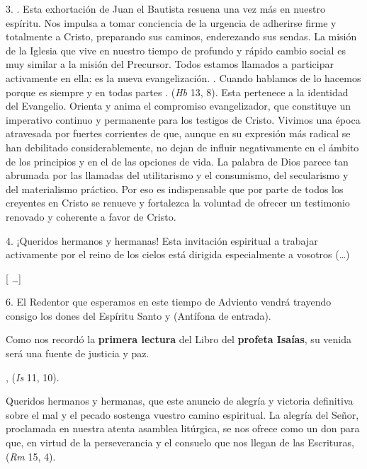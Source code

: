 \begin{body}
	3. . Esta exhortación de Juan el Bautista resuena una vez más en nuestro espíritu. Nos impulsa a tomar conciencia de la urgencia de adherirse firme y totalmente a Cristo, preparando sus caminos, enderezando sus sendas. La misión de la Iglesia que vive en nuestro tiempo de profundo y rápido cambio social es muy similar a la misión del Precursor. Todos estamos llamados a participar activamente en ella: es la nueva evangelización. . Cuando hablamos de  lo hacemos porque es siempre y en todas partes .  (\emph{Hb} 13, 8). Esta  pertenece a la identidad del Evangelio. Orienta y anima el compromiso evangelizador, que constituye un imperativo continuo y permanente para los testigos de Cristo. Vivimos una época atravesada por fuertes corrientes de  que, aunque en su expresión más radical se han debilitado considerablemente, no dejan de influir negativamente en el ámbito de los principios y en el de las opciones de vida. La palabra de Dios parece tan abrumada por las llamadas del utilitarismo y el consumismo, del secularismo y del materialismo práctico. Por eso es indispensable que por parte de todos los creyentes en Cristo se renueve y fortalezca la voluntad de ofrecer un testimonio renovado y coherente a favor de Cristo.
	
	4. ¡Queridos hermanos y hermanas! Esta invitación espiritual a trabajar activamente por el reino de los cielos está dirigida especialmente a vosotros (\ldots{})
	
	{[} \ldots{}{]}
	
	6. El Redentor que esperamos en este tiempo de Adviento vendrá trayendo consigo los dones del Espíritu Santo y  (Antífona de entrada).
	
	Como nos recordó la \textbf{primera lectura} del Libro del \textbf{profeta Isaías}, su venida será una fuente de justicia y paz.
	
	,  (\emph{Is} 11, 10). 
	
	Queridos hermanos y hermanas, que este anuncio de alegría y victoria definitiva sobre el mal y el pecado sostenga vuestro camino espiritual. La alegría del Señor, proclamada en nuestra atenta asamblea litúrgica, se nos ofrece como un don para que, en virtud de la perseverancia y el consuelo que nos llegan de las Escrituras,  (\emph{Rm} 15, 4). 
	

\end{body}
